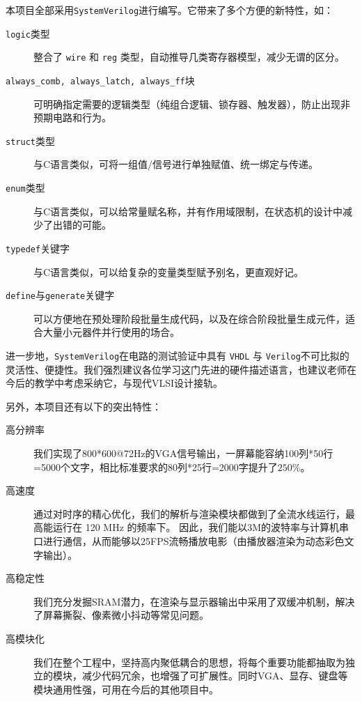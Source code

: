 本项目全部采用\texttt{SystemVerilog}进行编写。它带来了多个方便的新特性，如：
\begin{description}
  \item[\texttt{logic}类型] 整合了 \texttt{wire} 和 \texttt{reg} 类型，自动推导几类寄存器模型，减少无谓的区分。
  \item[\texttt{always\_comb, always\_latch, always\_ff}块] 可明确指定需要的逻辑类型（纯组合逻辑、锁存器、触发器），防止出现非预期电路和行为。
  \item[\texttt{struct}类型] 与C语言类似，可将一组值/信号进行单独赋值、统一绑定与传递。
  \item[\texttt{enum}类型] 与C语言类似，可以给常量赋名称，并有作用域限制，在状态机的设计中减少了出错的可能。
  \item[\texttt{typedef}关键字] 与C语言类似，可以给复杂的变量类型赋予别名，更直观好记。
  \item[\texttt{define}与\texttt{generate}关键字] 可以方便地在预处理阶段批量生成代码，以及在综合阶段批量生成元件，适合大量小元器件并行使用的场合。
\end{description}

进一步地，\texttt{SystemVerilog}在电路的测试验证中具有 \texttt{VHDL} 与 \texttt{Verilog}不可比拟的灵活性、便捷性。我们强烈建议各位学习这门先进的硬件描述语言，也建议老师在今后的教学中考虑采纳它，与现代VLSI设计接轨。

另外，本项目还有以下的突出特性：
\begin{description}
    \item[高分辨率] 我们实现了800*600@72Hz的VGA信号输出，一屏幕能容纳100列*50行=5000个文字，相比标准要求的80列*25行=2000字提升了$250\%$。
    \item[高速度] 通过对时序的精心优化，我们的解析与渲染模块都做到了全流水线运行，最高能运行在 120 MHz 的频率下。
    因此，我们能以3M的波特率与计算机串口进行通信，从而能够以25FPS流畅播放电影（由播放器渲染为动态彩色文字输出）。
    \item[高稳定性] 我们充分发掘SRAM潜力，在渲染与显示器输出中采用了双缓冲机制，解决了屏幕撕裂、像素微小抖动等常见问题。
    \item[高模块化] 我们在整个工程中，坚持高内聚低耦合的思想，将每个重要功能都抽取为独立的模块，减少代码冗余，也增强了可扩展性。同时VGA、显存、键盘等模块通用性强，可用在今后的其他项目中。
\end{description}


